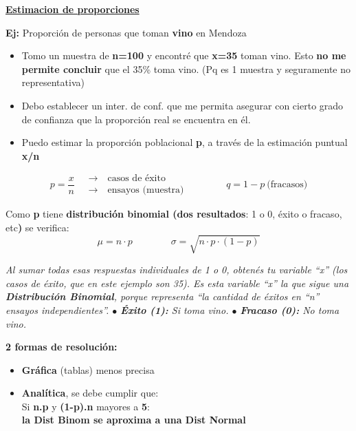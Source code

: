 \documentclass[10pt,a4paper]{article}
\begin{document}
{\large\bfseries\uline{Estimacion de proporciones}\par}
\vspace{2pt}

\textbf{Ej:} Proporción de personas que toman \textbf{vino} en Mendoza
\begin{itemize}[leftmargin=14pt,itemsep=1pt,topsep=1pt,parsep=0pt]
  \item Tomo un muestra de \textbf{n=100} y encontré que \textbf{x=35} toman vino. Esto \textbf{no me permite concluir} que el 35\% toma vino. (Pq es 1 muestra y seguramente no representativa)
  \item Debo establecer un inter. de conf. que me permita asegurar con cierto grado de confianza que la proporción real se encuentra en él.
  \item Puedo estimar la proporción poblacional \textbf{p}, a través de la estimación puntual \textbf{x/n}
\end{itemize}

\[
p = \frac{x}{n}
\quad
\begin{array}{l}
\longrightarrow \quad \text{casos de éxito} \\
\longrightarrow \quad \text{ensayos (muestra)}
\end{array}
\qquad\qquad q = 1-p \ \text{(fracasos)}
\]

Como \textbf{p} tiene \textbf{distribución binomial (dos resultados}: 1 o 0, éxito o fracaso, etc\textbf{)} se verifica:
\[
\mu = n\cdot p \qquad\qquad \sigma = \sqrt{n\cdot p\cdot (1-p)}
\]

{\footnotesize\itshape Al sumar todas esas respuestas individuales de 1 o 0, obtenés tu variable ``x'' (los casos de éxito, que en este ejemplo son 35). Es esta variable ``x'' la que sigue una \textbf{Distribución Binomial}, porque representa ``la cantidad de éxitos en ``n'' ensayos independientes''. \quad $\bullet$ \textbf{Éxito (1):} Si toma vino. \quad $\bullet$ \textbf{Fracaso (0):} No toma vino.\par}

\textbf{2 formas de resolución:}
\begin{itemize}[leftmargin=14pt,itemsep=1pt,topsep=1pt,parsep=0pt]
  \item[a)] \textbf{Gráfica} (tablas) menos precisa
  \item[b)] \textbf{Analítica}, se debe cumplir que: \\
  Si \textbf{n.p} y \textbf{(1-p).n} mayores a \textbf{5}: \\
  \textbf{la Dist Binom se aproxima a una Dist Normal}
\end{itemize}
\end{document}
